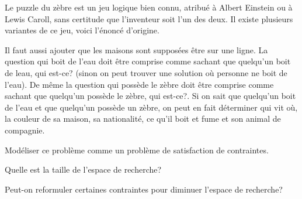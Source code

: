 \begin{td-exo}
    Le puzzle du zèbre est un jeu logique bien connu, atribué à Albert Einstein
    ou à Lewis Caroll, sans certitude que l'inventeur soit l'un des deux. Il
    existe plusieurs variantes de ce jeu, voici l'énoncé d'origine.
    

    Il faut aussi ajouter que les maisons sont supposées être sur une ligne. La
    question \og{}qui boit de l'eau\fg{} doit être comprise comme \og{}sachant que
    quelqu'un boit de leau, qui est-ce?\fg{} (sinon on peut trouver une solution
    où personne ne boit de l'eau). De même la question \og{}qui possède le zèbre\fg{} 
    doit être comprise comme \og{}sachant que quelqu'un possède le zèbre, qui est-ce?\fg{}.
    Si on sait que quelqu'un boit de l'eau et que quelqu'un possède un zèbre, on peut 
    en fait déterminer qui vit où, la couleur de sa maison, sa nationalité, ce qu'il 
    boit et fume et son animal de compagnie.

    Modéliser ce problème comme un problème de satisfaction de contraintes.

    Quelle est la taille de l'espace de recherche?

    Peut-on reformuler certaines contraintes pour diminuer l'espace de recherche?
\end{td-exo}